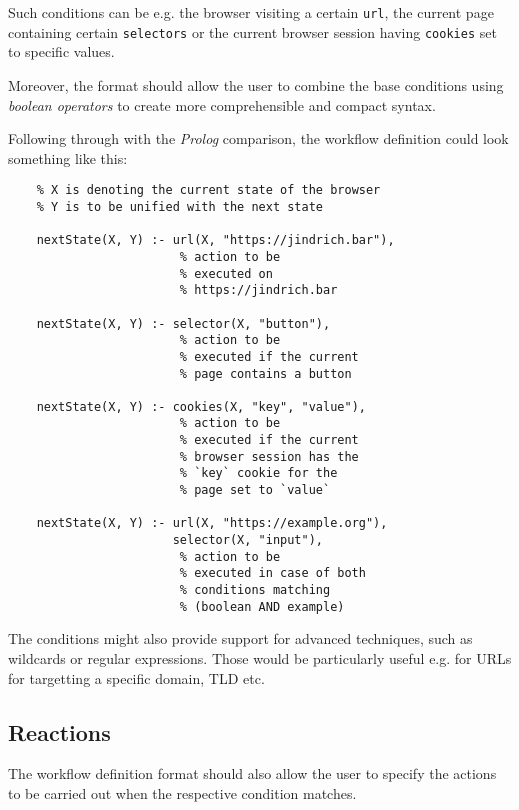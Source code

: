 Such conditions can be e.g. the browser visiting a certain \texttt{url}, the current page containing certain \texttt{selectors} or the current browser session having \texttt{cookies} set to specific values.

Moreover, the format should allow the user to combine the base conditions using \textit{boolean operators} to create more comprehensible and compact syntax.

Following through with the \textit{Prolog} comparison, the workflow definition could look something like this:

\begin{minipage}{0.95\linewidth}
\begin{verbatim}
    % X is denoting the current state of the browser
    % Y is to be unified with the next state

    nextState(X, Y) :- url(X, "https://jindrich.bar"),
                        % action to be 
                        % executed on 
                        % https://jindrich.bar
    
    nextState(X, Y) :- selector(X, "button"),
                        % action to be 
                        % executed if the current 
                        % page contains a button
    
    nextState(X, Y) :- cookies(X, "key", "value"),
                        % action to be 
                        % executed if the current 
                        % browser session has the
                        % `key` cookie for the  
                        % page set to `value`
    
    nextState(X, Y) :- url(X, "https://example.org"),
                       selector(X, "input"),
                        % action to be 
                        % executed in case of both
                        % conditions matching 
                        % (boolean AND example)

\end{verbatim}
\end{minipage}

The conditions might also provide support for advanced techniques, such as wildcards or regular expressions.
Those would be particularly useful e.g. for URLs for targetting a specific domain, TLD etc.

\subsection{Reactions}

The workflow definition format should also allow the user to specify the actions to be carried out when the respective condition matches.

